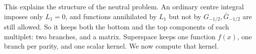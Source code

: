 This explains the structure of the neutral problem. An ordinary centre integral imposes only $L_1=0$, and functions annihilated by $L_1$ but not by $G_{-1/2},\bar G_{-1/2}$ are still allowed. So it keeps both the bottom and the top components of each multiplet: two branches, and a matrix. Superspace keeps one function $f(x)$, one branch per parity, and one scalar kernel. We now compute that kernel.
